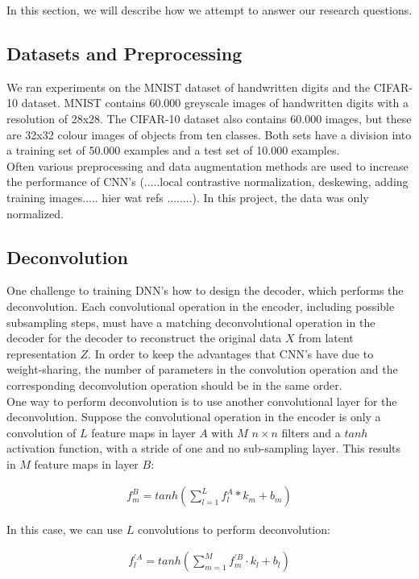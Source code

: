 In this section, we will describe how we attempt to answer our research questions.

\subsection{Datasets and Preprocessing}

We ran experiments on the MNIST dataset of handwritten digits and the CIFAR-10 dataset. MNIST contains 60.000 greyscale images of handwritten digits with a resolution of 28x28. The CIFAR-10 dataset also contains 60.000 images, but these are 32x32 colour images of objects from ten classes. Both sets have a division into a training set of 50.000 examples and a test set of 10.000 examples. \\
Often various preprocessing and data augmentation methods are used to increase the performance of CNN's (.....local contrastive normalization, deskewing, adding training images..... hier wat refs ........). In this project, the data was only normalized.

\subsection{Deconvolution}
One challenge to training DNN's how to design the decoder, which performs the deconvolution. Each convolutional operation in the encoder, including possible subsampling steps, must have a matching deconvolutional operation in the decoder for the decoder to reconstruct the original data $X$ from latent representation $Z$. In order to keep the advantages that CNN's have due to weight-sharing, the number of parameters in the convolution operation and the corresponding deconvolution operation should be in the same order. \\
One way to perform deconvolution is to use another convolutional layer for the deconvolution. Suppose the convolutional operation in the encoder is only a convolution of $L$ feature maps in layer $A$ with $M$ $n \times n$ filters and a $tanh$ activation function, with a stride of one and no sub-sampling layer. This results in $M$ feature maps in layer $B$:

\begin{align}
\label{eq:conv}
f^B_m = tanh( \sum_{l=1}^{L}  f^A_l*k_m + b_m)
\end{align}

In this case, we can use $L$ convolutions to perform deconvolution:

\begin{align}
f^{\prime A}_l = tanh( \sum_{m=1}^{M}  f^{\prime B}_m \cdot k_l + b_l)
\end{align}

